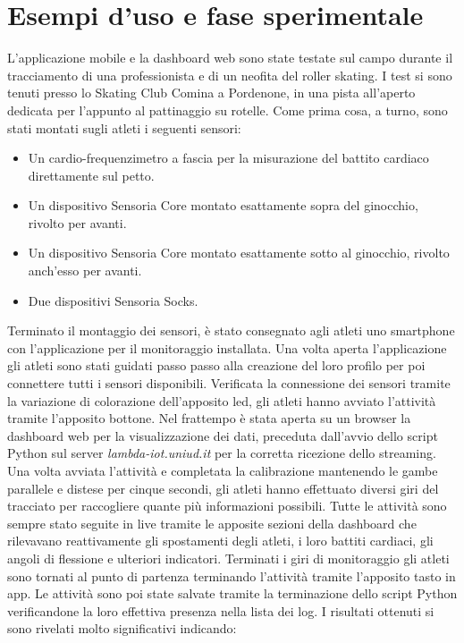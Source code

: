 \documentclass[target=bach,aauheader=,style=]{thud}
\begin{document}
\section{Esempi d'uso e fase sperimentale}\label{esempi}
L'applicazione mobile e la dashboard web sono state testate sul campo durante il tracciamento di una professionista e di un neofita del roller skating. I test si sono tenuti presso lo Skating Club Comina a Pordenone, in una pista all'aperto dedicata per l'appunto al pattinaggio su rotelle. Come prima cosa, a turno, sono stati montati sugli atleti i seguenti sensori:
\begin{itemize}
  \item Un cardio-frequenzimetro a fascia per la misurazione del battito cardiaco direttamente sul petto.
  \item Un dispositivo Sensoria Core montato esattamente sopra del ginocchio, rivolto per avanti.
  \item Un dispositivo Sensoria Core montato esattamente sotto al ginocchio, rivolto anch'esso per avanti.
  \item Due dispositivi Sensoria Socks.
\end{itemize}
Terminato il montaggio dei sensori, è stato consegnato agli atleti uno smartphone con l'applicazione per il monitoraggio installata. Una volta aperta l'applicazione gli atleti sono stati guidati passo passo alla creazione del loro profilo per poi connettere tutti i sensori disponibili. Verificata la connessione dei sensori tramite la variazione di colorazione dell'apposito led, gli atleti hanno avviato l'attività tramite l'apposito bottone. Nel frattempo è stata aperta su un browser la dashboard web per la visualizzazione dei dati, preceduta dall'avvio dello script Python sul server \textit{lambda-iot.uniud.it} per la corretta ricezione dello streaming. Una volta avviata l'attività e completata la calibrazione mantenendo le gambe parallele e distese per cinque secondi, gli atleti hanno effettuato diversi giri del tracciato per raccogliere quante più informazioni possibili. Tutte le attività sono sempre stato seguite in live tramite le apposite sezioni della dashboard che rilevavano reattivamente gli spostamenti degli atleti, i loro battiti cardiaci, gli angoli di flessione e ulteriori indicatori. Terminati i giri di monitoraggio gli atleti sono tornati al punto di partenza terminando l'attività tramite l'apposito tasto in app. Le attività sono poi state salvate tramite la terminazione dello script Python verificandone la loro effettiva presenza nella lista dei log. I risultati ottenuti si sono rivelati molto significativi indicando:
\end{document}

